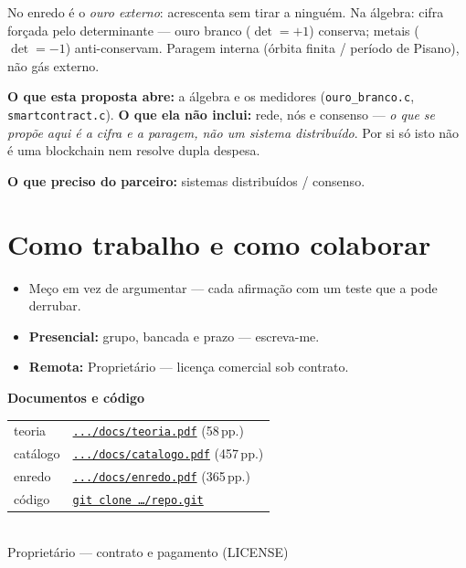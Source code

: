 \documentclass[11pt,a4paper]{article}
\begin{document}
No enredo é o \emph{ouro externo}: acrescenta sem tirar a ninguém. Na álgebra: cifra
forçada pelo determinante --- ouro branco ($\det=+1$) conserva; metais ($\det=-1$)
anti-conservam. Paragem interna (órbita finita / período de Pisano), não gás externo.

\smallskip
\textbf{O que esta proposta abre:} a álgebra e os medidores (\texttt{ouro\_branco.c},
\texttt{smartcontract.c}). \textbf{O que ela não inclui:} rede, nós e consenso ---
\emph{o que se propõe aqui é a cifra e a paragem, não um sistema distribuído}. Por si só isto
não é uma blockchain nem resolve dupla despesa.

\smallskip
\textbf{O que preciso do parceiro:} sistemas distribuídos / consenso.

\section*{Como trabalho e como colaborar}

\begin{itemize}
\item Meço em vez de argumentar --- cada afirmação com um teste que a pode derrubar.
\item \textbf{Presencial:} grupo, bancada e prazo --- escreva-me.
\item \textbf{Remota:} Proprietário — licença comercial sob contrato.
\end{itemize}

\medskip
\begin{center}\small
\textbf{Documentos e código}\\[4pt]
\begin{tabular}{@{}ll@{}}
teoria &
\href{https://goldenkingdom.patriatechnology.com/docs/teoria.pdf}{\texttt{.../docs/teoria.pdf}}
\quad (58\,pp.) \\
catálogo &
\href{https://goldenkingdom.patriatechnology.com/docs/catalogo.pdf}{\texttt{.../docs/catalogo.pdf}}
\quad (457\,pp.) \\
enredo &
\href{https://goldenkingdom.patriatechnology.com/docs/enredo.pdf}{\texttt{.../docs/enredo.pdf}}
\quad (365\,pp.) \\
código &
\href{https://goldenkingdom.patriatechnology.com/repo.git}{\texttt{git clone \ldots/repo.git}} \\
\end{tabular}
\\[4pt]
{\footnotesize\color{cinza}Proprietário — contrato e pagamento (LICENSE)}
\end{center}
\end{document}
